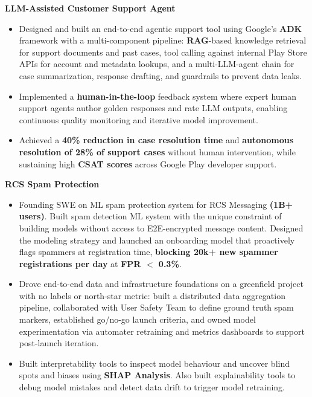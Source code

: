 \documentclass[a4,10pt]{article}
\newenvironment{zitemize}{
\begin{itemize}\itemsep0pt \parskip0pt \parsep1pt}
{\end{itemize}\vspace{-0.5cm}}
\newcommand{\hprojectname}[1]{\vspace{0.4cm}\noindent\textbf{#1}\vspace{-0.1cm}}
\begin{document}
    \hprojectname{LLM-Assisted Customer Support Agent}
    \begin{zitemize}
        \item Designed and built an end-to-end agentic support tool using Google's \textbf{ADK} framework with a multi-component pipeline: \textbf{RAG}-based knowledge retrieval for support documents and past cases, tool calling against internal Play Store APIs for account and metadata lookups, and a multi-LLM-agent chain for case summarization, response drafting, and guardrails to prevent data leaks.
        \item Implemented a \textbf{human-in-the-loop} feedback system where expert human support agents author golden responses and rate LLM outputs, enabling continuous quality monitoring and iterative model improvement.
        \item Achieved a \textbf{40\% reduction in case resolution time} and \textbf{autonomous resolution of 28\% of support cases} without human intervention, while sustaining high \textbf{CSAT scores} across Google Play developer support.
    \end{zitemize}

    \hprojectname{RCS Spam Protection}
    \begin{zitemize}
        \item Founding SWE on ML spam protection system for RCS Messaging \textbf{(1B+ users)}. Built spam detection ML system with the unique constraint of building models without access to E2E-encrypted message content. Designed the modeling strategy and launched an onboarding model that proactively flags spammers at registration time, \textbf{blocking 20k+ new spammer registrations per day} at \textbf{FPR $<$ 0.3\%}.
        \item Drove end-to-end data and infrastructure foundations on a greenfield project with no labels or north-star metric: built a distributed data aggregation pipeline, collaborated with User Safety Team to define ground truth spam markers, established go/no-go launch criteria, and owned model experimentation via automater retraining and metrics dashboards to support post-launch iteration.
        \item Built interpretability tools to inspect model behaviour and uncover blind spots and biases using \textbf{SHAP Analysis}. Also built explainability tools to debug model mistakes and detect data drift to trigger model retraining.
    \end{zitemize}
    
\end{document}
